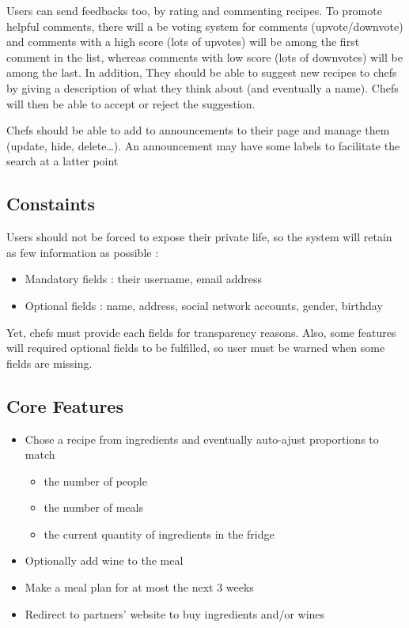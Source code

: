 \documentclass[english,12pt,twoside,a4paper]{article}
\begin{document}
Users can send feedbacks too, by rating and commenting recipes. To promote helpful comments, there will a be voting system for comments (upvote/downvote) and comments with a high score (lots of upvotes) will be among the first comment in the list, whereas comments with low score (lots of downvotes) will be among the last. In addition, They should be able to suggest new recipes to chefs by giving a description of what they think about (and eventually a name). Chefs will then be able to accept or reject the suggestion.

Chefs should be able to add to announcements to their page and manage them (update, hide, delete…). An announcement may have some labels to facilitate the search at a latter point

\subsection{Constaints}
Users should not be forced to expose their private life, so the system will retain as few information as possible :
\begin{itemize}
  \item Mandatory fields : their username, email address
  \item Optional fields : name, address, social network accounts, gender, birthday
\end{itemize}

\noindent
Yet, chefs must provide each fields for transparency reasons. Also, some features will required optional fields to be fulfilled, so user must be warned when some fields are missing.

\subsection{Core Features}
\begin{itemize}
  \item Chose a recipe from ingredients and eventually auto-ajust proportions to match
        \begin{itemize}
          \item the number of people
          \item the number of meals
          \item the current quantity of ingredients in the fridge
        \end{itemize}
  \item Optionally add wine to the meal
  \item Make a meal plan for at most the next 3 weeks
  \item Redirect to partners' website to buy ingredients and/or wines
\end{itemize}
\end{document}
